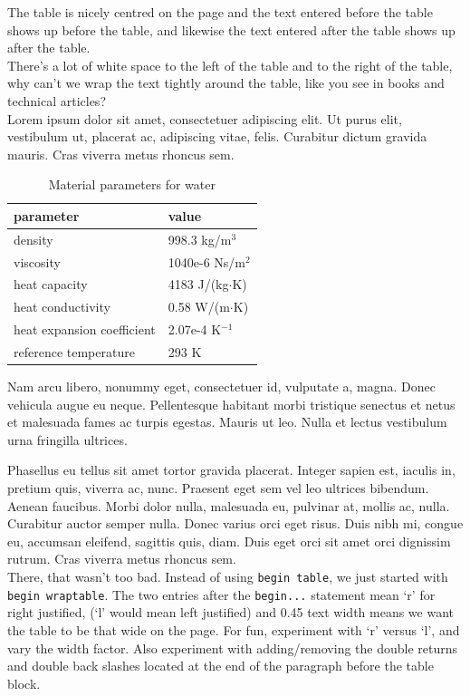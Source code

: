 The table is nicely centred on the page and the text entered before the table shows up before the table, and likewise the text entered  after the table shows up after the table.\\

There's a lot of white space to the left of the table and to the right of the table, why can't we wrap the text tightly around the table,  like you see in books and technical articles?\\

Lorem ipsum dolor sit amet, consectetuer adipiscing elit. Ut purus elit, vestibulum ut, placerat ac, adipiscing vitae, felis. Curabitur dictum gravida mauris.  Cras viverra metus rhoncus sem.\\

\begin{table}
\caption{Material parameters for water}
\label{tb:matpar}
\centering
\begin{tabular}{ll} \hline
parameter  & value \\ \hline
density & 998.3 kg/m$^{3}$ \\
viscosity & 1040e-6 Ns/m$^{2}$ \\
heat capacity & 4183 J/(kg$\cdot$K) \\
heat conductivity & 0.58 W/(m$\cdot$K)       \\
heat expansion coefficient & 2.07e-4 K$^{-1}$      \\ 
reference temperature & 293 K       \\ \hline
\end{tabular}
\end{table}

Nam arcu libero, nonummy eget, consectetuer id, vulputate a, magna. Donec vehicula augue eu neque. Pellentesque habitant morbi tristique senectus et netus et malesuada fames ac turpis egestas. Mauris ut leo.  Nulla et lectus vestibulum urna fringilla ultrices.

Phasellus eu tellus sit amet tortor gravida placerat. Integer sapien est, iaculis in, pretium quis, viverra ac, nunc. Praesent eget sem vel leo ultrices bibendum. Aenean faucibus.  Morbi dolor nulla, malesuada eu, pulvinar at, mollis ac, nulla. Curabitur auctor semper nulla. Donec varius orci eget risus. Duis nibh mi, congue eu, accumsan eleifend, sagittis quis, diam. Duis eget orci sit amet orci dignissim rutrum.   Cras viverra metus rhoncus sem.\\

There, that wasn't too bad.  Instead of using \texttt{begin table}, we just started with \texttt{begin wraptable}.  The two entries after the \texttt{begin...} statement mean `r' for right justified, (`l' would mean left justified) and 0.45 text width means we want the table to be that wide on the page.  For fun, experiment with `r' versus `l', and vary the width factor.  Also experiment with adding/removing  the double returns and double back slashes located at the end of the paragraph before the table block.\\

